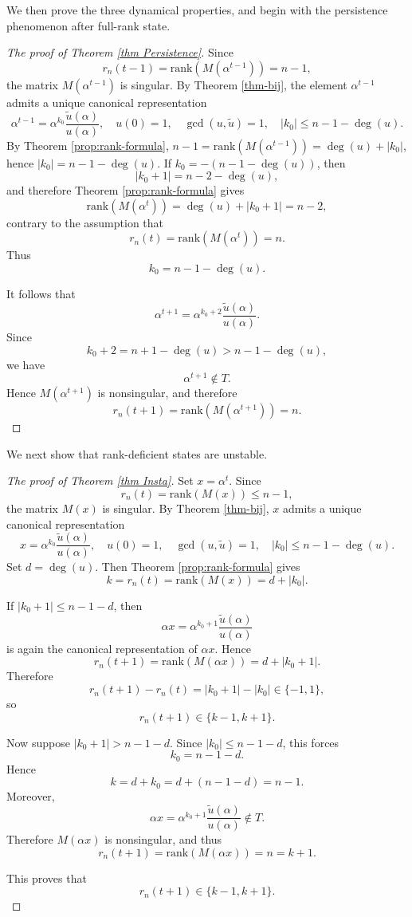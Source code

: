 \documentclass[hidelinks,onefignum,onetabnum]{siamart251216}
\theoremstyle{definition}
\theoremstyle{remark}
\providecommand{\rank}{{\mathrm{rank}}}
\begin{document}
We then prove the three dynamical properties, and begin with the persistence phenomenon after full-rank state.


\begin{proof}[The proof of Theorem \ref{thm Persistence}]
	Since
	\[
	r_n(t-1)=\rank(M(\alpha^{t-1}))=n-1,
	\]
	the matrix $M(\alpha^{t-1})$ is singular. By Theorem \ref{thm-bij}, the element $\alpha^{t-1}$ admits a unique canonical representation
	\[
	\alpha^{t-1}=\alpha^{k_0}\frac{\widetilde u(\alpha)}{u(\alpha)},
	\quad
	u(0)=1,\quad \gcd(u,\widetilde u)=1,\quad |k_0|\le n-1-\deg(u).
	\]
	By Theorem \ref{prop:rank-formula}, $n-1=\rank(M(\alpha^{t-1}))=\deg(u)+|k_0|$, hence $|k_0|=n-1-\deg(u)$. If $k_0=-(n-1-\deg(u))$, then
	\[
	|k_0+1|=n-2-\deg(u),
	\]
	and therefore Theorem \ref{prop:rank-formula} gives
	\[
	\rank(M(\alpha^t))
	=\deg(u)+|k_0+1|
	=n-2,
	\]
	contrary to the assumption that
	\[
	r_n(t)=\rank(M(\alpha^t))=n.
	\]
	Thus
	\[
	k_0=n-1-\deg(u).
	\]
	
	It follows that
	\[
	\alpha^{t+1}
	=\alpha^{k_0+2}\frac{\widetilde u(\alpha)}{u(\alpha)}.
	\]
	Since
	\[
	k_0+2=n+1-\deg(u)>n-1-\deg(u),
	\]
	we have
	\[
	\alpha^{t+1}\notin T.
	\]
	Hence $M(\alpha^{t+1})$ is nonsingular, and therefore
	\[
	r_n(t+1)=\rank(M(\alpha^{t+1}))=n.
	\]
\end{proof}

We next show that rank-deficient states are unstable.




\begin{proof}[The proof of Theorem \ref{thm Insta}]
	Set $x=\alpha^t$. Since
	\[
	r_n(t)=\rank(M(x))\le n-1,
	\]
	the matrix $M(x)$ is singular. By Theorem \ref{thm-bij}, $x$ admits a unique canonical representation
	\[
	x=\alpha^{k_0}\frac{\widetilde u(\alpha)}{u(\alpha)},
	\quad
	u(0)=1,\quad \gcd(u,\widetilde u)=1,\quad |k_0|\le n-1-\deg(u).
	\]
	Set $d=\deg(u)$. Then Theorem \ref{prop:rank-formula} gives
	\[
	k=r_n(t)=\rank(M(x))=d+|k_0|.
	\]
	
	If $|k_0+1|\le n-1-d$, then
	\[
	\alpha x=\alpha^{k_0+1}\frac{\widetilde u(\alpha)}{u(\alpha)}
	\]
	is again the canonical representation of $\alpha x$. Hence
	\[
	r_n(t+1)=\rank(M(\alpha x))=d+|k_0+1|.
	\]
	Therefore
	\[
	r_n(t+1)-r_n(t)=|k_0+1|-|k_0|\in\{-1,1\},
	\]
	so
	\[
	r_n(t+1)\in\{k-1,k+1\}.
	\]
	
	Now suppose $|k_0+1|>n-1-d$. Since $|k_0|\le n-1-d$, this forces
	\[
	k_0=n-1-d.
	\]
	Hence
	\[
	k=d+k_0=d+(n-1-d)=n-1.
	\]
	Moreover,
	\[
	\alpha x=\alpha^{k_0+1}\frac{\widetilde u(\alpha)}{u(\alpha)}\notin T.
	\]
	Therefore $M(\alpha x)$ is nonsingular, and thus
	\[
	r_n(t+1)=\rank(M(\alpha x))=n=k+1.
	\]
	
	This proves that
	\[
	r_n(t+1)\in\{k-1,k+1\}.
	\]
\end{proof}
\end{document}
